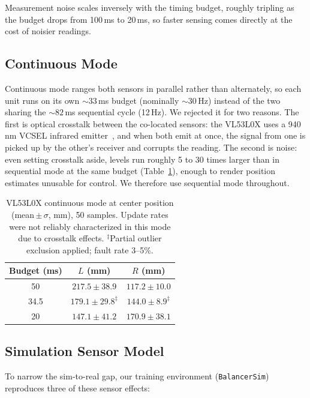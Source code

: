 Measurement noise scales inversely with the timing budget, roughly tripling
as the budget drops from 100\,ms to 20\,ms, so faster sensing comes directly
at the cost of noisier readings.

\subsection{Continuous Mode}

Continuous mode ranges both sensors in parallel rather than alternately,
so each unit runs on its own ${\sim}33$\,ms budget (nominally ${\sim}30$\,Hz)
instead of the two sharing the ${\sim}82$\,ms sequential cycle (12\,Hz).
We rejected it for two reasons. The first is optical crosstalk between the co-located
sensors: the VL53L0X uses a 940\,nm VCSEL infrared
emitter~\cite{vl53l0x_datasheet}, and when both emit at once, the signal from
one is picked up by the other's receiver and corrupts the reading. The second
is noise: even setting crosstalk aside, levels run roughly 5 to 30 times
larger than in sequential mode at the same budget (Table~\ref{tab:cont_char}),
enough to render position estimates unusable for control. We therefore use sequential
mode throughout.

\begin{table}[!t]
\centering
\caption{VL53L0X continuous mode at center position
         (mean\,$\pm\,\sigma$, mm), 50 samples. Update rates were
         not reliably characterized in this mode due to crosstalk
         effects. $^\ddagger$Partial outlier
         exclusion applied; fault rate 3--5\%.}
\label{tab:cont_char}
\begin{tabular}{ccc}
\toprule
\textbf{Budget (ms)} & $L$ (mm) & $R$ (mm) \\
\midrule
50   & $217.5\pm38.9$          & $117.2\pm10.0$ \\
34.5 & $179.1\pm29.8^\ddagger$ & $144.0\pm8.9^\ddagger$ \\
20   & $147.1\pm41.2$          & $170.9\pm38.1$ \\
\bottomrule
\end{tabular}
\end{table}

\subsection{Simulation Sensor Model}
\label{appendix:sensor_sim_model}

To narrow the sim-to-real gap, our training environment
(\texttt{BalancerSim}) reproduces three of these sensor effects:

